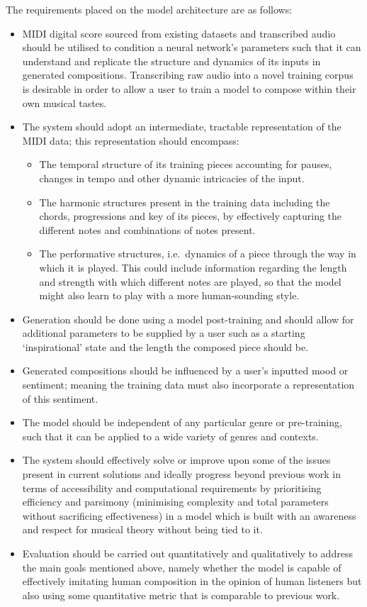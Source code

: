 \documentclass[12pt,]{article}
\providecommand{\tightlist}{%
  \setlength{\itemsep}{0pt}\setlength{\parskip}{0pt}}
\begin{document}
The requirements placed on the model architecture are as follows:

\begin{itemize}
\tightlist
\item
  MIDI digital score sourced from existing datasets and transcribed
  audio should be utilised to condition a neural network's parameters
  such that it can understand and replicate the structure and dynamics
  of its inputs in generated compositions. Transcribing raw audio into a
  novel training corpus is desirable in order to allow a user to train a
  model to compose within their own musical tastes.
\item
  The system should adopt an intermediate, tractable representation of
  the MIDI data; this representation should encompass:

  \begin{itemize}
  \tightlist
  \item
    The temporal structure of its training pieces accounting for pauses,
    changes in tempo and other dynamic intricacies of the input.
  \item
    The harmonic structures present in the training data including the
    chords, progressions and key of its pieces, by effectively capturing
    the different notes and combinations of notes present.
  \item
    The performative structures, i.e.~dynamics of a piece through the
    way in which it is played. This could include information regarding
    the length and strength with which different notes are played, so
    that the model might also learn to play with a more human-sounding
    style.
  \end{itemize}
\item
  Generation should be done using a model post-training and should allow
  for additional parameters to be supplied by a user such as a starting
  `inspirational' state and the length the composed piece should be.
\item
  Generated compositions should be influenced by a user's inputted mood
  or sentiment; meaning the training data must also incorporate a
  representation of this sentiment.
\item
  The model should be independent of any particular genre or
  pre-training, such that it can be applied to a wide variety of genres
  and contexts.
\item
  The system should effectively solve or improve upon some of the issues
  present in current solutions and ideally progress beyond previous work
  in terms of accessibility and computational requirements by
  prioritising efficiency and parsimony (minimising complexity and total
  parameters without sacrificing effectiveness) in a model which is
  built with an awareness and respect for musical theory without being
  tied to it.
\item
  Evaluation should be carried out quantitatively and qualitatively to
  address the main goals mentioned above, namely whether the model is
  capable of effectively imitating human composition in the opinion of
  human listeners but also using some quantitative metric that is
  comparable to previous work.
\end{itemize}
\end{document}
